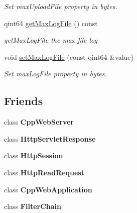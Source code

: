 \begin{DoxyCompactItemize}
\begin{DoxyCompactList}\small\item\em Set max\+Upload\+File property in bytes. \end{DoxyCompactList}\item 
qint64 \mbox{\hyperlink{class_configuration_a05ee88466fbe346175ec6420b6857b98}{get\+Max\+Log\+File}} () const
\begin{DoxyCompactList}\small\item\em get\+Max\+Log\+File the max file log \end{DoxyCompactList}\item 
void \mbox{\hyperlink{class_configuration_a3c26bb11f458d7374fd4c5b53e181aee}{set\+Max\+Log\+File}} (const qint64 \&value)
\begin{DoxyCompactList}\small\item\em Set max\+Log\+File property in bytes. \end{DoxyCompactList}\end{DoxyCompactItemize}
\subsection*{Friends}
\begin{DoxyCompactItemize}
\item 
\mbox{\label{class_configuration_af35951d3389bacc3d625fc73174f7364}} 
class {\bfseries Cpp\+Web\+Server}
\item 
\mbox{\label{class_configuration_a84765570a5386c96f10067fb0e11bc13}} 
class {\bfseries Http\+Servlet\+Response}
\item 
\mbox{\label{class_configuration_a3e611175a551b64dda26f513067e0d04}} 
class {\bfseries Http\+Session}
\item 
\mbox{\label{class_configuration_a4d54f5003e07e218070a449c22a52c7c}} 
class {\bfseries Http\+Read\+Request}
\item 
\mbox{\label{class_configuration_af79af37b83b26f7eeb57dcb953a09845}} 
class {\bfseries Cpp\+Web\+Application}
\item 
\mbox{\label{class_configuration_a14d4dda0e6f3fa404ebad6cc84ab5ca6}} 
class {\bfseries Filter\+Chain}
\end{DoxyCompactItemize}


